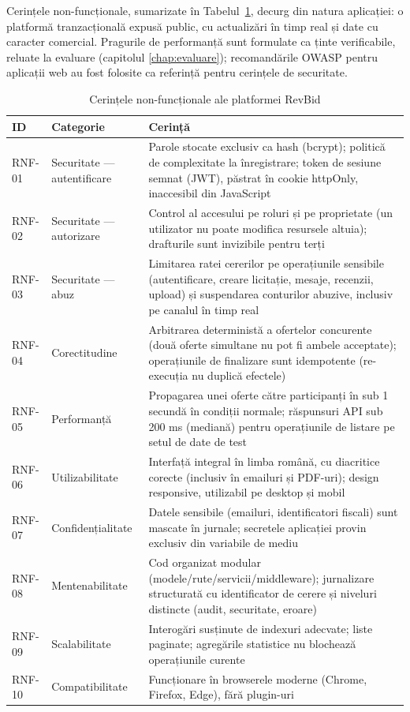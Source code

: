 Cerințele non-funcționale, sumarizate în Tabelul~\ref{tab:cerinte-nefunctionale}, decurg din natura aplicației: o platformă tranzacțională expusă public, cu actualizări în timp real și date cu caracter comercial. Pragurile de performanță sunt formulate ca ținte verificabile, reluate la evaluare (capitolul \ref{chap:evaluare}); recomandările OWASP pentru aplicații web \cite{owasp2021} au fost folosite ca referință pentru cerințele de securitate.

\begin{table}[!ht]\small\linespread{1}
\centering
\caption{Cerințele non-funcționale ale platformei RevBid}
\label{tab:cerinte-nefunctionale}
\begin{tabular}{l >{\raggedright\arraybackslash}p{4cm} >{\raggedright\arraybackslash}p{9cm}}
\toprule
\textbf{ID} & \textbf{Categorie} & \textbf{Cerință} \\
\midrule
RNF-01 & Securitate --- autentificare & Parole stocate exclusiv ca hash (bcrypt); politică de complexitate la înregistrare; token de sesiune semnat (JWT), păstrat în cookie httpOnly, inaccesibil din JavaScript \\
RNF-02 & Securitate --- autorizare & Control al accesului pe roluri și pe proprietate (un utilizator nu poate modifica resursele altuia); drafturile sunt invizibile pentru terți \\
RNF-03 & Securitate --- abuz & Limitarea ratei cererilor pe operațiunile sensibile (autentificare, creare licitație, mesaje, recenzii, upload) și suspendarea conturilor abuzive, inclusiv pe canalul în timp real \\
RNF-04 & Corectitudine & Arbitrarea deterministă a ofertelor concurente (două oferte simultane nu pot fi ambele acceptate); operațiunile de finalizare sunt idempotente (re-execuția nu duplică efectele) \\
RNF-05 & Performanță & Propagarea unei oferte către participanți în sub 1 secundă în condiții normale; răspunsuri API sub 200 ms (mediană) pentru operațiunile de listare pe setul de date de test \\
RNF-06 & Utilizabilitate & Interfață integral în limba română, cu diacritice corecte (inclusiv în emailuri și PDF-uri); design responsive, utilizabil pe desktop și mobil \\
RNF-07 & Confidențialitate & Datele sensibile (emailuri, identificatori fiscali) sunt mascate în jurnale; secretele aplicației provin exclusiv din variabile de mediu \\
RNF-08 & Mentenabilitate & Cod organizat modular (modele/rute/servicii/middleware); jurnalizare structurată cu identificator de cerere și niveluri distincte (audit, securitate, eroare) \\
RNF-09 & Scalabilitate & Interogări susținute de indexuri adecvate; liste paginate; agregările statistice nu blochează operațiunile curente \\
RNF-10 & Compatibilitate & Funcționare în browserele moderne (Chrome, Firefox, Edge), fără plugin-uri \\
\bottomrule
\end{tabular}
\end{table}

